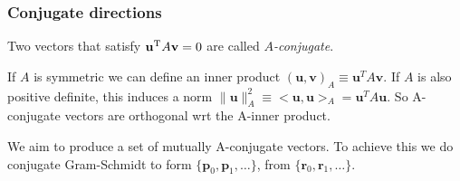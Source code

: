 \documentclass[12pt, a4paper]{article}
\renewcommand{\vec}[1]{\mathbf{#1}}
\theoremstyle{definition}
\theoremstyle{remark}
\numberwithin{equation}{section}
\begin{document}
\subsubsection*{Conjugate directions}

Two vectors that satisfy $\vec{u}^{\rm T}A \vec{v}=0$ are called \emph{$A$-conjugate}.

If $A$ is symmetric we can define an inner product $( \vec{u},\vec{v} )_A \equiv \vec{u}^T A\vec{v}$.
If $A$ is also positive definite, this induces a norm $\|\vec{u}\|^2_A \equiv <\vec{u}, \vec{u}>_A= \vec{u}^T A\vec{u}$. So A-conjugate vectors are orthogonal wrt the 
A-inner product. 

We aim to produce a set of mutually A-conjugate vectors. 
To achieve this we do conjugate Gram-Schmidt to form $\{\vec{p}_0,\vec{p}_1,\ldots\}$, from $\{\vec{r}_0,\vec{r}_1,\ldots\}$.
\end{document}
